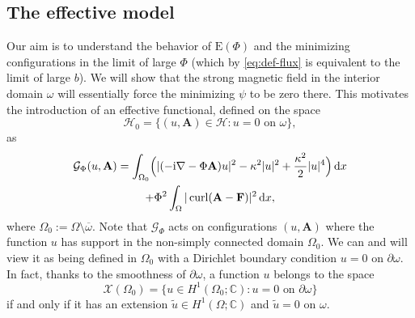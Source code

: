 \documentclass[11pt]{amsart}
\DeclareMathOperator{\curl}{curl}
\newcommand{\C}{\mathbb C}
\newcommand{\Ab}{\mathbf A}
\newcommand{\Fb}{\mathbf F}
\newcommand{\dd}{\mathop{}\!{\mathrm d}}
\newcommand{\ii}{\mathrm i}
\newcommand{\En}{\mathrm E(\Phi)}
\newcommand{\Gf}{\mathcal G_\Phi}
\newcommand{\cX}{\mathcal X}
\newcommand{\cH}{\mathcal H}
\theoremstyle{definition}
\numberwithin{equation}{section}
\begin{document}
\subsection{The effective  model}
%
Our aim is to understand the behavior of $\En$ and the minimizing configurations in the limit of large $\Phi$ (which by \eqref{eq:def-flux} is equivalent to the limit of large $b$). We will show that the strong magnetic field in the interior domain \(\omega\) will essentially force the minimizing \(\psi\) to be zero there. This motivates the introduction of an effective functional, defined on the space
\begin{equation}\label{eq:def-space0}
\cH_0=\{(u,\Ab)\in \cH\colon u=0\text{ on }\omega\},
\end{equation}
as
\begin{multline}\label{eq:def-GL0}
\Gf(u,\Ab)=
\int_{\Omega_0}\Bigl(|(-\ii\nabla-\Phi \Ab)u|^2-\kappa^2|u|^2+\frac{\kappa^2}{2}|u|^4 \Bigr)\dd x\\+\Phi^2\int_{\Omega}|\curl(\Ab-\Fb)|^2\dd x,
\end{multline}
where $\Omega_0:=\Omega\setminus{\overline\omega}$.  Note that $\Gf$ acts on configurations $(u,\Ab)$ where the function $u$ has support in the non-simply connected domain $\Omega_0$. We can and will view it as being defined in \(\Omega_0\) with a Dirichlet boundary condition $u=0$ on $\partial\omega$. In fact,  thanks to the smoothness of $\partial\omega$, a function $u$ belongs to the space
\begin{equation}\label{eq:def-space0*}
\cX(\Omega_0)=\{u\in H^1(\Omega_0;\C)\colon u=0\mbox{ on }\partial\omega\}
\end{equation}
if and only if it has an extension $\widetilde u\in H^1(\Omega;\C)$ and $\widetilde u=0$ on $\omega$.
\end{document}
